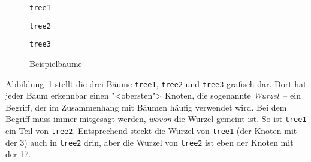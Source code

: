 \begin{figure}[tb]
  \centering
  \begin{minipage}{0.3\textwidth}
\begin{center}
  \lstinline{tree1}\\[1ex]
\end{center}
\end{minipage}
\begin{minipage}{0.3\textwidth}
\begin{center}
  \lstinline{tree2}\\[1ex]
\end{center}
\end{minipage}
\begin{minipage}{0.3\textwidth}
\begin{center}
  \lstinline{tree3}\\[1ex]
\end{center}
\end{minipage}
\caption{Beispielbäume}
  \label{fig:tree123}
\end{figure}

\noindent Abbildung~\ref{fig:tree123} stellt die drei Bäume \lstinline{tree1},
\lstinline{tree2} und \lstinline{tree3} grafisch dar.  Dort hat jeder
Baum erkennbar einen "<obersten"> Knoten, die sogenannte
\textit{Wurzel}~-- ein Begriff, der im Zusammenhang mit
Bäumen häufig verwendet wird.  Bei dem Begriff muss immer mitgesagt
werden, \emph{wovon} die Wurzel gemeint ist. So ist 
\lstinline{tree1} ein Teil von \lstinline{tree2}.  Entsprechend steckt
die Wurzel von \lstinline{tree1} (der Knoten mit der 3) auch in
\lstinline{tree2} drin, aber die Wurzel von \lstinline{tree2} ist eben
der Knoten mit der 17.

